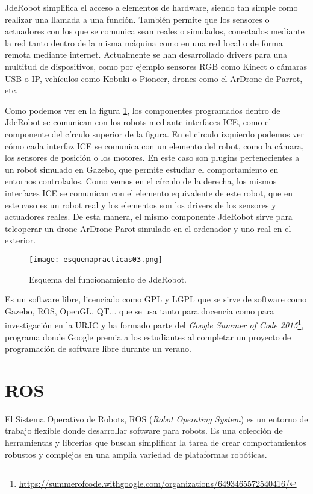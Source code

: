 JdeRobot simplifica el acceso a elementos de hardware, siendo tan simple como realizar una llamada a una función. También permite que los sensores o actuadores con los que se comunica sean reales o simulados, conectados mediante la red tanto dentro de la misma máquina como en una red local o de forma remota mediante internet. Actualmente se han desarrollado drivers para una multitud de dispositivos, como por ejemplo sensores RGB como Kinect o cámaras USB o IP, vehículos como Kobuki o Pioneer, drones como el ArDrone de Parrot, etc.

Como podemos ver en la figura \ref{fig:esquemapracticas03}, los componentes programados dentro de JdeRobot se comunican con los robots mediante interfaces ICE, como el componente del círculo superior de la figura. En el circulo izquierdo podemos ver cómo cada interfaz ICE se comunica con un elemento del robot, como la cámara, los sensores de posición o los motores. En este caso son plugins pertenecientes a un robot simulado en Gazebo, que permite estudiar el comportamiento en entornos controlados. Como vemos en el círculo de la derecha, los mismos interfaces ICE se comunican con el elemento equivalente de este robot, que en este caso es un robot real y los elementos son los drivers de los sensores y actuadores reales. De esta manera, el mismo componente JdeRobot sirve para teleoperar un drone ArDrone Parot simulado en el ordenador y uno real en el exterior.

\begin{figure}[ht]
	\centering
	\texttt{[image: esquemapracticas03.png]}
	\caption{Esquema del funcionamiento de JdeRobot.} \label{fig:esquemapracticas03}
\end{figure}

Es un software libre, licenciado como GPL y LGPL que se sirve de software como Gazebo, ROS, OpenGL, QT... que se usa tanto para docencia como para investigación en la URJC y ha formado parte del \textit{Google Summer of Code 2015}\footnote{\url{https://summerofcode.withgoogle.com/organizations/6493465572540416/}}, programa donde Google premia a los estudiantes al completar un proyecto de programación de software libre durante un verano.


\section{ROS}
\label{sec:inf_ros}

El Sistema Operativo de Robots, ROS\cite{ros} (\textit{Robot Operating System}) es un entorno de trabajo flexible donde desarrollar software para robots. Es una colección de herramientas y librerías que buscan simplificar la tarea de crear comportamientos robustos y complejos en una amplia variedad de plataformas robóticas. 

